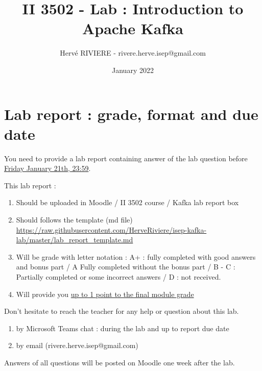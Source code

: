 \documentclass{article}
\newcounter{question}
\begin{document}
\title{II 3502 - Lab : Introduction to Apache Kafka}
\author{Hervé RIVIERE - rivere.herve.isep@gmail.com}
\date{January 2022}
\maketitle


\section{Lab report : grade, format and due date}

You need to provide a lab report containing answer of the lab question before \underline{Friday January 21th, 23:59}.

\vspace{5mm}
This lab report : 
\begin{enumerate}
\item Should be uploaded in Moodle / II 3502 course / Kafka lab report box
\item Should follows the template (md file) \url{https://raw.githubusercontent.com/HerveRiviere/isep-kafka-lab/master/lab_report_template.md}
\item Will be grade with letter notation : A+ : fully completed with good answers and bonus part / A Fully completed without the bonus part / B - C : Partially completed or some incorrect answers / D : not received.
\item Will provide you \underline{up to 1 point to the final module grade}
\end{enumerate}
\vspace{5mm}
Don't hesitate to reach the teacher for any help or question about this lab. 
\begin{enumerate}
    \item by Microsoft Teams chat  : during the lab and up to report due date
    \item by email (rivere.herve.isep@gmail.com)
\end{enumerate}

\vspace{5mm}

Answers of all questions will be posted on Moodle one week after the lab.
\end{document}
